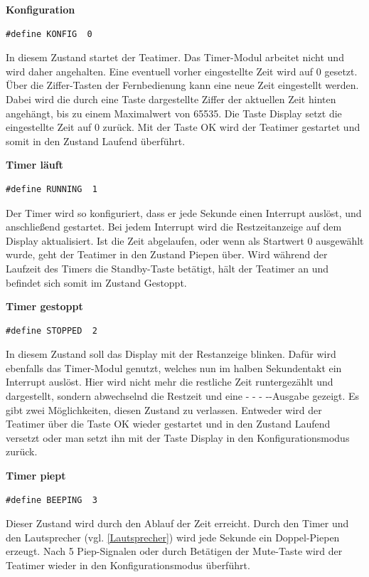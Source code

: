 \documentclass[12pt,a4paper,bibliography=totocnumbered,listof=totocnumbered]{scrartcl}
\begin{document}
\textbf{Konfiguration}
\begin{lstlisting}
#define KONFIG  0
\end{lstlisting}
In diesem Zustand startet der Teatimer. Das Timer-Modul arbeitet nicht und wird daher angehalten. Eine eventuell vorher eingestellte Zeit wird auf 0 gesetzt. Über die Ziffer-Tasten der Fernbedienung kann eine neue Zeit eingestellt werden. Dabei wird die durch eine Taste dargestellte Ziffer der aktuellen Zeit hinten angehängt, bis zu einem Maximalwert von 65535. Die Taste \glqq Display\grqq{} setzt die eingestellte Zeit auf 0 zurück. Mit der Taste \glqq OK\grqq{} wird der Teatimer gestartet und somit in den Zustand \glqq Laufend\grqq{} überführt.

\textbf{Timer läuft}
\begin{lstlisting}
#define RUNNING  1
\end{lstlisting}
Der Timer wird so konfiguriert, dass er jede Sekunde einen Interrupt auslöst, und anschließend gestartet. Bei jedem Interrupt wird die Restzeitanzeige auf dem Display aktualisiert. Ist die Zeit abgelaufen, oder wenn als Startwert 0 ausgewählt wurde, geht der Teatimer in den Zustand \glqq Piepen\grqq{} über. Wird während der Laufzeit des Timers die \glqq Standby\grqq{}-Taste betätigt, hält der Teatimer an und befindet sich somit im Zustand \glqq Gestoppt\grqq{}.

\textbf{Timer gestoppt}
\begin{lstlisting}
#define STOPPED  2
\end{lstlisting}
In diesem Zustand soll das Display mit der Restanzeige blinken. Dafür wird ebenfalls das Timer-Modul genutzt, welches nun im halben Sekundentakt ein Interrupt auslöst. Hier wird nicht mehr die restliche Zeit runtergezählt und dargestellt, sondern abwechselnd die Restzeit und eine \glqq - - - -\grqq{}-Ausgabe gezeigt. Es gibt zwei Möglichkeiten, diesen Zustand zu verlassen. Entweder wird der Teatimer über die Taste \glqq OK\grqq{} wieder gestartet und in den Zustand \glqq Laufend\grqq{} versetzt oder man setzt ihn mit der Taste \glqq Display\grqq{} in den Konfigurationsmodus zurück.

\textbf{Timer piept}
\begin{lstlisting}
#define BEEPING  3
\end{lstlisting}
Dieser Zustand wird durch den Ablauf der Zeit erreicht. Durch den Timer und den Lautsprecher (vgl. \ref{Lautsprecher}) wird jede Sekunde ein Doppel-Piepen erzeugt. Nach 5 Piep-Signalen oder durch Betätigen der \glqq Mute\grqq{}-Taste wird der Teatimer wieder in den Konfigurationsmodus überführt.
\end{document}
